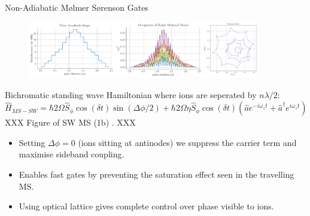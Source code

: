 \documentclass[final]{beamer}
\begin{document}
\begin{frame}{}
\begin{center}
\begin{columns}[t]
\begin{column}{0.49\textwidth}
\begin{alertblock}{Non-Adiabatic Mølmer Sørenson Gates}
      \begin{figure}
        \includegraphics[width=0.9\textwidth]{./figs/loop_closing.png}
      \end{figure}

      Bichromatic standing wave Hamiltonian where ions are seperated by $n\lambda/2$:
      \large$$ \hat{H}_{MS-SW} = \hbar 2\Omega \hat{S}_{\phi}\cos{(\delta t)}\sin{(\Delta\phi/2)} + \hbar 2\Omega\eta \hat{S}_\phi\cos{(\delta t)}(\hat{a}e^{-i\omega_zt} + \hat{a}^\dagger e^{i\omega_zt})\cos{(\Delta\phi/2)}$$\normalsize
        XXX Figure of SW MS (1b) . XXX
      \begin{itemize}
      \item Setting $\Delta\phi = 0$ (ions sitting at antinodes) we
        suppress the carrier term and maximise sideband
        coupling.\\
      \item Enables fast gates by preventing the saturation effect seen in the travelling MS.\\
      \item Using optical lattice gives complete control over phase visible to ions. \\
      \end{itemize}


\end{alertblock}
\end{column}
\end{columns}
\end{center}
\end{frame}
\end{document}
